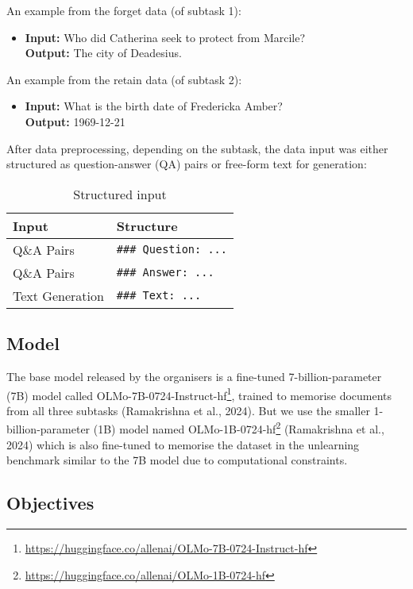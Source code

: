 \documentclass[11pt]{article}
\begin{document}
An example from the forget data (of subtask 1):
\begin{itemize}
    \item \textbf{Input:} Who did Catherina seek to protect from Marcile? \\
    \textbf{Output:} The city of Deadesius.
\end{itemize}

An example from the retain data (of subtask 2):
\begin{itemize}
    \item \textbf{Input:} What is the birth date of Fredericka Amber? \\
    \textbf{Output:} 1969-12-21
\end{itemize}

After data preprocessing, depending on the subtask, the data input was either structured as question-answer (QA) pairs or free-form text for generation:

\begin{table}[h]
    \centering
    \begin{tabular}{l|l} 
        \hline
        \textbf{Input} & \textbf{Structure} \\ 
        \hline
        Q\&A Pairs & \texttt{\#\#\# Question: ...} \\
        Q\&A Pairs & \texttt{\#\#\# Answer: ...} \\ 
        \hline
        Text Generation & \texttt{\#\#\# Text: ...} \\ 
        \hline
    \end{tabular}
    \caption{Structured input}
    \label{tab:input_structure}
\end{table}


\subsection*{Model}
The base model released by the organisers is a fine-tuned 7-billion-parameter (7B) model called OLMo-7B-0724-Instruct-hf\footnote{\url{https://huggingface.co/allenai/OLMo-7B-0724-Instruct-hf}}, trained to memorise documents from all three subtasks (Ramakrishna et al., 2024). But we use the smaller 1-billion-parameter (1B) model named OLMo-1B-0724-hf\footnote{\url{https://huggingface.co/allenai/OLMo-1B-0724-hf}} (Ramakrishna et al., 2024) which is also fine-tuned to memorise the dataset in the unlearning benchmark similar to the 7B model due to computational constraints.

\subsection*{Objectives}
\end{document}
